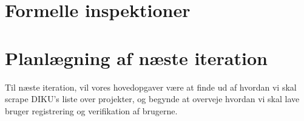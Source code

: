 \documentclass[11pt]{article}
\begin{document}
\section{Formelle inspektioner}

\section{Planlægning af næste iteration}
Til næste iteration, vil vores hovedopgaver være at finde ud af hvordan vi skal scrape DIKU's liste over projekter, og begynde at overveje hvordan vi skal lave bruger registrering og verifikation af brugerne.
\end{document}
